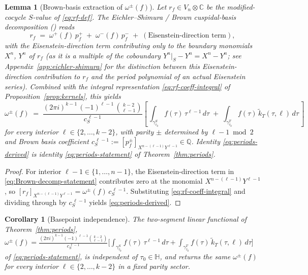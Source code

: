 \documentclass[11pt]{article}
\newtheorem{lemma}[theorem]{Lemma}
\newtheorem{corollary}[theorem]{Corollary}
\numberwithin{equation}{section}  %
\newcommand{\HH}{\mathbb{H}}
\newcommand{\QQ}{\mathbb{Q}}
\newcommand{\CC}{\mathbb{C}}
\begin{document}
\begin{lemma}[Brown-basis extraction of $\omega^\pm(f)$]\label{lem:brown-decomp}
Let $r_f \in V_n \otimes \CC$ be the modified-cocycle $S$-value of
\eqref{eq:rf-def}.  The Eichler--Shimura / Brown cuspidal-basis
decomposition (\cite{Brown2017,KZ1984}) reads
\begin{equation}\label{eq:Brown-decomp-statement}
  r_f \;=\; \omega^+(f)\,p^+_f \;+\; \omega^-(f)\,p^-_f \;+\; (\text{Eisenstein-direction term}),
\end{equation}
with the Eisenstein-direction term contributing only to the boundary
monomials $X^n$, $Y^n$ of $r_f$ (as it is a multiple of the coboundary
$Y^n|_S - Y^n = X^n - Y^n$; see Appendix~\ref{app:eichler-shimura} for
the distinction between this Eisenstein-\emph{direction} contribution
to $r_f$ and the period polynomial of an actual Eisenstein series).  Combined with the integral
representation \eqref{eq:rf-coeff-integral} of
Proposition~\ref{prop:kernels}, this yields
\begin{equation}\label{eq:periods-derived}
  \omega^\pm(f)
  \;=\; \frac{(2\pi i)^{k - 1}\,(-1)^{\ell - 1}\,\binom{k - 2}{\ell - 1}}{c_S^{\,\ell - 1}}\!
  \left[\,\int_{\gamma^S_{\tau_0}}\! f(\tau)\,\tau^{\ell - 1}\,d\tau
        \;+\; \int_{\gamma^T_{\tau_0}}\! f(\tau)\,\widetilde{k}_T(\tau, \ell)\,d\tau\,\right]
\end{equation}
for every interior $\ell \in \{2, \ldots, k - 2\}$, with parity $\pm$
determined by $\ell - 1 \bmod 2$ and Brown basis coefficient
$c_S^{\,\ell - 1} := [p^\pm_f]_{X^{n - (\ell - 1)} Y^{\ell - 1}} \in \QQ$.
Identity \eqref{eq:periods-derived} is identity
\eqref{eq:periods-statement} of Theorem~\ref{thm:periods}.
\end{lemma}

\begin{proof}
For interior $\ell - 1 \in \{1, \ldots, n - 1\}$, the
Eisenstein-direction term in \eqref{eq:Brown-decomp-statement}
contributes zero at the monomial $X^{n - (\ell - 1)} Y^{\ell - 1}$, so
$[r_f]_{X^{n - (\ell - 1)} Y^{\ell - 1}} = \omega^\pm(f)\,c_S^{\,\ell - 1}$.
Substituting \eqref{eq:rf-coeff-integral} and dividing through by
$c_S^{\,\ell - 1}$ yields \eqref{eq:periods-derived}.
\end{proof}

\begin{corollary}[Basepoint independence]\label{cor:tau0-ell-indep}
The two-segment linear functional of Theorem~\ref{thm:periods},
$\omega^\pm(f) = \frac{(2\pi i)^{k - 1}(-1)^{\ell - 1}\binom{k - 2}{\ell - 1}}{c_S^{\,\ell - 1}}\!\bigl[\int_{\gamma^S_{\tau_0}}\!f(\tau)\,\tau^{\ell - 1}\,d\tau + \int_{\gamma^T_{\tau_0}}\!f(\tau)\,\widetilde{k}_T(\tau, \ell)\,d\tau\bigr]$
of \eqref{eq:periods-statement}, is independent of $\tau_0 \in \HH$, and
returns the same $\omega^\pm(f)$ for every interior
$\ell \in \{2, \ldots, k - 2\}$ in a fixed parity sector.
\end{corollary}
\end{document}
